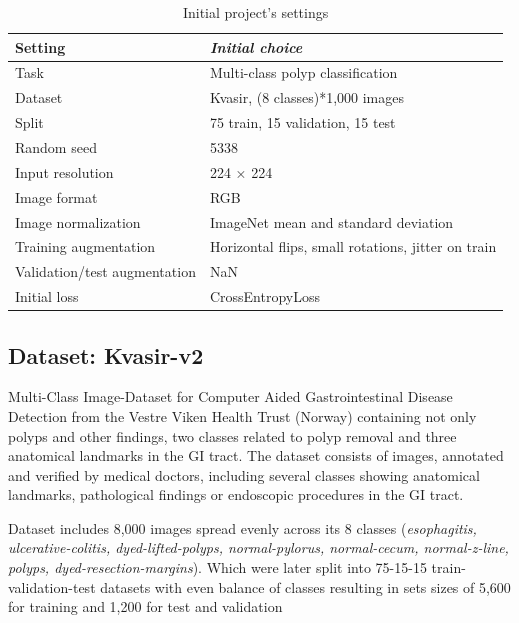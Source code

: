 \documentclass[conference]{IEEEtran}
\begin{document}
\begin{table}[htbp]
\caption{Initial project's settings}
\begin{center}
\begin{tabular}{|m{8em}|m{15em}|}
\hline
\textbf{Setting}&\textit{Initial choice}\\
\hline
    Task & Multi-class polyp classification \\
    \hline
    Dataset & Kvasir, (8 classes)*1,000 images \\
    \hline
    Split & 75 train, 15 validation, 15 test \\
    \hline
    Random seed & 5338 \\
    \hline
    Input resolution & 224 × 224 \\
    \hline
    Image format & RGB \\
    \hline
    Image normalization & ImageNet mean and standard deviation \\
    \hline
    Training augmentation & Horizontal flips, small rotations, jitter on train \\
    \hline
    Validation/test augmentation & NaN \\
    \hline
    Initial loss & CrossEntropyLoss \\
\hline
\end{tabular}
\label{tables:tab1}
\end{center}
\end{table}

\subsection{Dataset: Kvasir-v2}

Multi-Class Image-Dataset for Computer Aided Gastrointestinal Disease Detection from the Vestre Viken Health Trust (Norway) containing not only polyps and other findings, two classes related to polyp removal and three anatomical landmarks in the GI tract. The dataset consists of images, annotated and verified by medical doctors, including several classes showing anatomical landmarks, pathological findings or endoscopic procedures in the GI tract.

Dataset includes 8,000 images spread evenly across its 8 classes (\textit{esophagitis, ulcerative-colitis, dyed-lifted-polyps, normal-pylorus, normal-cecum, normal-z-line, polyps, dyed-resection-margins}). Which were later split into 75-15-15 train-validation-test datasets with even balance of classes resulting in sets sizes of 5,600 for training and 1,200 for test and validation
\end{document}

